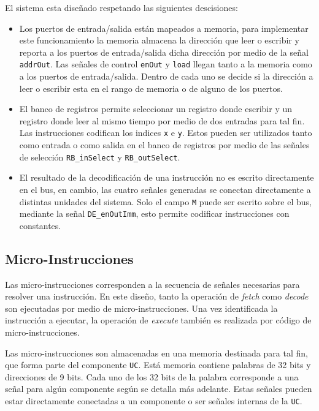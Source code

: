 \documentclass[a4paper,11pt]{article}
\begin{document}
El sistema esta diseñado respetando las siguientes descisiones:

\begin{itemize}
 \item Los puertos de entrada/salida están mapeados a memoria, para implementar este funcionamiento la memoria almacena la dirección que leer o escribir y reporta a los puertos de entrada/salida dicha dirección por medio de la señal \texttt{addrOut}. Las señales de control \texttt{enOut} y \texttt{load} llegan tanto a la memoria como a los puertos de entrada/salida. Dentro de cada uno se decide si la dirección a leer o escribir esta en el rango de memoria o de alguno de los puertos.
 \item El banco de registros permite seleccionar un registro donde escribir y un registro donde leer al mismo tiempo por medio de dos entradas para tal fin.
 Las instrucciones codifican los indices \texttt{x} e \texttt{y}. Estos pueden ser utilizados tanto como entrada o como salida en el banco de registros por medio de las señales de selección \texttt{RB\_inSelect} y \texttt{RB\_outSelect}.
 \item El resultado de la decodificación de una instrucción no es escrito directamente en el bus, en cambio, las cuatro señales generadas se conectan directamente a distintas unidades del sistema. Solo el campo \texttt{M} puede ser escrito sobre el bus, mediante la señal \texttt{DE\_enOutImm}, esto permite codificar instrucciones con constantes.
\end{itemize}

\subsection*{Micro-Instrucciones}

Las micro-instrucciones corresponden a la secuencia de señales necesarias para resolver una instrucción.
En este diseño, tanto la operación de \emph{fetch} como \emph{decode} son ejecutadas por medio de micro-instrucciones.
Una vez identificada la instrucción a ejecutar, la operación de \emph{execute} también es realizada por código de micro-instrucciones.

Las micro-instrucciones son almacenadas en una memoria destinada para tal fin, que forma parte del componente \texttt{UC}.
Está memoria contiene palabras de 32 bits y direcciones de 9 bits.
Cada uno de los 32 bits de la palabra corresponde a una señal para algún componente según se detalla más adelante.
Estas señales pueden estar directamente conectadas a un componente o ser señales internas de la \texttt{UC}.
\end{document}
